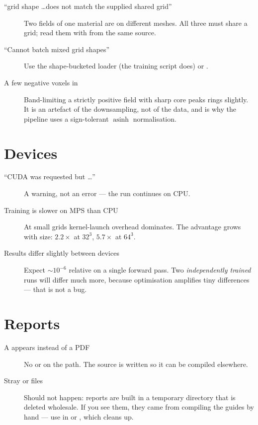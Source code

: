 \begin{description}
  \item[``grid shape \ldots does not match the supplied shared grid''] Two
    fields of one material are on different meshes. All three must share a grid;
    read them with  from the same source.
  \item[``Cannot batch mixed grid shapes''] Use the shape-bucketed loader
    (the training script does) or .
  \item[A few negative voxels in ] Band-limiting a strictly
    positive field with sharp core peaks rings slightly. It is an artefact of
    the downsampling, not of the data, and is why the pipeline uses a
    sign-tolerant $\operatorname{asinh}$ normalisation.
\end{description}

\section{Devices}

\begin{description}
  \item[``CUDA was requested but \ldots''] A warning, not an error --- the run
    continues on CPU.
  \item[Training is slower on MPS than CPU] At small grids kernel-launch
    overhead dominates. The advantage grows with size: $2.2\times$ at $32^3$,
    $5.7\times$ at $64^3$.
  \item[Results differ slightly between devices] Expect $\sim10^{-6}$ relative
    on a single forward pass. Two \emph{independently trained} runs will differ
    much more, because optimisation amplifies tiny differences --- that is not a
    bug.
\end{description}

\section{Reports}

\begin{description}
  \item[A  appears instead of a PDF] No  or
     on the path. The source is written so it can be compiled
    elsewhere.
  \item[Stray  or  files] Should not happen: reports are
    built in a temporary directory that is deleted wholesale. If you see them,
    they came from compiling the guides by hand --- use  in
     or , which cleans up.
\end{description}
